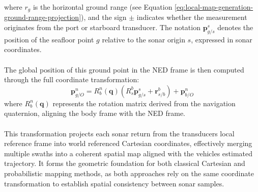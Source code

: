 where $r_g$ is the horizontal ground range (see Equation \ref{eq:local-map-generation-ground-range-projection}), and the sign $\pm$ indicates whether the measurement originates from the port or starboard transducer. The notation $\mathbf{p}_{g/s}^{s}$ denotes the position of the seafloor point $g$ relative to the sonar origin $s$, expressed in sonar coordinates.  
\\ \\
The global position of this ground point in the NED frame is then computed through the full coordinate transformation:
\begin{equation}
    \mathbf{p}_{g/O}^{n} =
    R_b^n(\mathbf{q})
    \left( R_s^b \mathbf{p}_{g/s}^{s} + \mathbf{r}_{s/b}^{b} \right)
    + \mathbf{p}_{b/O}^{n}
    \label{eq:local-map-generation-polar-to-cartesian}
\end{equation}
where $R_b^n(\mathbf{q})$ represents the rotation matrix derived from the navigation quaternion, aligning the body frame with the NED frame.  
\\ \\
This transformation projects each sonar return from the transducers local reference frame into world referenced Cartesian coordinates, effectively merging multiple swaths into a coherent spatial map aligned with the vehicles estimated trajectory. It forms the geometric foundation for both classical Cartesian and probabilistic mapping methods, as both approaches rely on the same coordinate transformation to establish spatial consistency between sonar samples.


